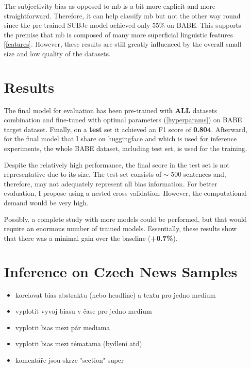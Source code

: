 The subjectivity bias as opposed to \gls{mb} is a bit more explicit and more straightforward. Therefore, it can help classify \gls{mb} but not the other way round since the pre-trained SUBJe model achieved only 55\% on BABE. This supports the premise that \gls{mb} is composed of many more superficial linguistic features \ref{features}. However, these results are still greatly influenced by the overall small size and low quality of the datasets.




\section{Results}
The final model for evaluation has been pre-trained with \textbf{ALL} datasets combination and fine-tuned with optimal parameters (\ref{hyperparams}) on BABE target dataset. Finally, on a \textbf{test} set it achieved an F1 score of \textbf{0.804}. Afterward, for the final model that I share on huggingface and which is used for inference experiments, the whole BABE dataset, including test set, is used for the training.


Despite the relatively high performance, the final score in the test set is not representative due to its size. The test set consists of $\sim$ 500 sentences and, therefore, may not adequately represent all bias information. For better evaluation, I propose using a nested cross-validation. However, the computational demand would be very high. 

Possibly, a complete study with more models could be performed, but that would require an enormous number of trained models. Essentially, these results show that there was a minimal gain over the baseline (\textbf{+0.7\%}).



  

\section{Inference on Czech News Samples}\label{inference}

\begin{itemize}
    \item korelovat bias abstraktu (nebo headline) a textu pro jedno medium
    \item vyplotit vyvoj biasu v čase pro jedno medium
    \item vyplotit bias mezi pár mediama
    \item vyplotit bias mezi tématama (bydlení atd)
    \item komentáře jsou skrze "section" super
\end{itemize}

